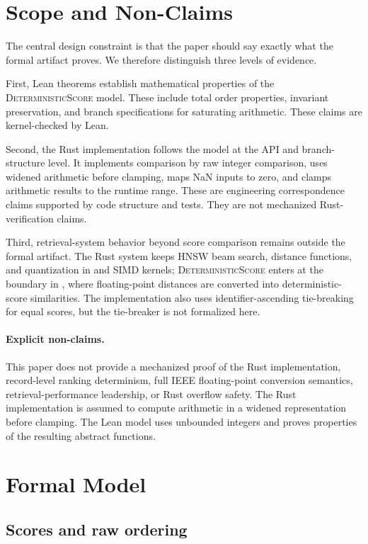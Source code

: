 \documentclass[a4paper,UKenglish,cleveref,autoref,thm-restate,anonymous]{lipics-v2021}
\newcommand{\rustname}[1]{\texttt{\detokenize{#1}}}
\newcommand{\ds}{\textsc{DeterministicScore}\xspace}
\begin{document}
\section{Scope and Non-Claims}
\label{sec:scope}

The central design constraint is that the paper should say exactly what the formal artifact proves.  We therefore distinguish three levels of evidence.

First, Lean theorems establish mathematical properties of the \ds model.  These include total order properties, invariant preservation, and branch specifications for saturating arithmetic.  These claims are kernel-checked by Lean.

Second, the Rust implementation follows the model at the API and branch-structure level.  It implements comparison by raw integer comparison, uses widened arithmetic before clamping, maps NaN inputs to zero, and clamps arithmetic results to the runtime range.  These are engineering correspondence claims supported by code structure and tests.  They are not mechanized Rust-verification claims.

Third, retrieval-system behavior beyond score comparison remains outside the formal artifact.  The Rust system keeps HNSW beam search, distance functions, and quantization in \rustname{f32} and SIMD kernels; \ds enters at the boundary in \rustname{search_deterministic()}, where floating-point distances are converted into deterministic-score similarities.  The implementation also uses identifier-ascending tie-breaking for equal scores, but the tie-breaker is not formalized here.

\paragraph*{Explicit non-claims.}
This paper does not provide a mechanized proof of the Rust implementation, record-level ranking determinism, full IEEE floating-point conversion semantics, retrieval-performance leadership, or Rust overflow safety. The Rust implementation is assumed to compute arithmetic in a widened representation before clamping. The Lean model uses unbounded integers and proves properties of the resulting abstract functions.

\section{Formal Model}
\label{sec:model}

\subsection{Scores and raw ordering}
\end{document}
